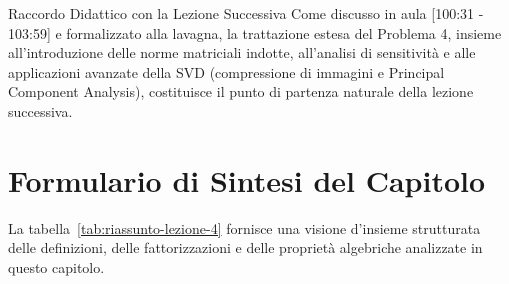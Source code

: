 \begin{noteblock}{Raccordo Didattico con la Lezione Successiva}
Come discusso in aula [100:31 - 103:59] e formalizzato alla lavagna, la trattazione estesa del Problema 4, insieme all'introduzione delle norme matriciali indotte, all'analisi di sensitivit\`a e alle applicazioni avanzate della SVD (compressione di immagini e Principal Component Analysis), costituisce il punto di partenza naturale della lezione successiva.
\end{noteblock}

\clearpage
\section{Formulario di Sintesi del Capitolo}
\label{sec:svd-formulario-sintesi}

La tabella~\ref{tab:riassunto-lezione-4} fornisce una visione d'insieme strutturata delle definizioni, delle fattorizzazioni e delle propriet\`a algebriche analizzate in questo capitolo.

